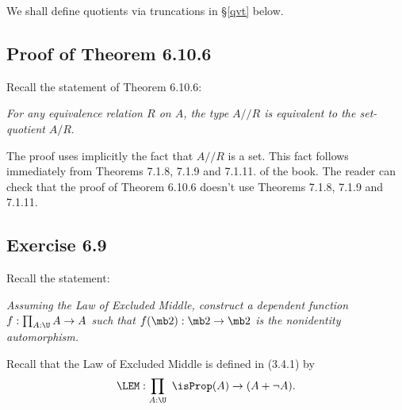 \documentclass[12pt]{article}
\begin{document}
We shall define quotients via truncations in \S\ref{qvt} below.

\begin{comment}

To spell out the induction principle for the quotient $A/R$, let $\alpha(a,b):q(a)=q(b)$ be the path given from $q(a)$ to $q(b)$ whenever $R(a,b)$. 

Given $P:A/R\to\Set$ together with $f:\prod_{a:A}\ P(q(a))$ and 
$$
\beta(a,b):f(a)=^P_{\alpha(a,b)}f(b)
$$ 
for all $a,b$ such that $R(a,b)$, we have a $g:\prod_{x:A/R}P(x)$ such that $g(q(a))\equiv f(a)$ for all $a:A$, and $\apd_g(\alpha(a,b))=\beta(a,b)$ for all $a,b$ such that $R(a,b)$.

It is easy to see that if our type family $P:A/R\to\Set$ is such that $P(q(b))$ is a mere proposition whenever $R(a,b)$, and if we are just given an $f:\prod_{a:A}P(q(a))$, then we get a $g:\prod_{x:A/R}P(x)$ such that $g(q(a))\eq f(a)$ for all $a:A$.

\end{comment}


\subsection{Proof of Theorem 6.10.6}

Recall the statement of Theorem 6.10.6: 

\emph{For any equivalence relation $R$ on $A$, the type $A/\!\!/R$ is equivalent to the set-quotient} $A/R$.

The proof uses implicitly the fact that $A/\!\!/R$ is a set. This fact follows immediately from Theorems 7.1.8, 7.1.9 and 7.1.11. of the book. The reader can check that the proof of Theorem 6.10.6 doesn't use Theorems 7.1.8, 7.1.9 and 7.1.11.


\subsection{Exercise 6.9}


Recall the statement:

\emph{Assuming the Law of Excluded Middle, construct a dependent function $f:\prod_{A:\U}A\to A$ such that $f(\mb2):\mb2\to\mb2$ is the nonidentity automorphism.}

Recall that the Law of Excluded Middle is defined in (3.4.1) by 
$$
\LEM:\prod_{A:\U}\ \isProp(A)\to(A+\neg A).
$$ 
\end{document}

